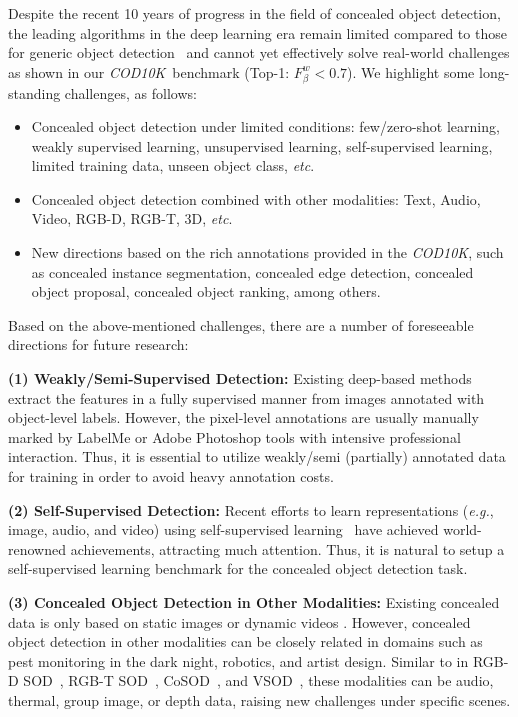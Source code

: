 \documentclass[10pt,journal,compsoc]{IEEEtran}
\def\eg{\emph{e.g.}}
\def\etc{\emph{etc}}
\def\ourdataset{\textit{COD10K}}
\begin{document}
Despite the recent 10 years of progress in the field of concealed object 
detection, 
the leading algorithms in the deep learning era remain limited compared to 
those for generic object detection~\cite{liu2020deep} and cannot yet 
effectively solve real-world challenges as shown in our \ourdataset~benchmark 
(Top-1: $F_\beta^w<0.7$). 
We highlight some long-standing challenges, as follows:
\begin{itemize}
\item Concealed object detection under limited conditions: 
few/zero-shot learning, weakly supervised learning, unsupervised learning, 
self-supervised learning, limited training data, unseen object class, \etc.

\item Concealed object detection combined with other modalities: 
Text, Audio, Video, RGB-D, RGB-T, 3D, \etc.

\item New directions based on the rich annotations provided in the \ourdataset,
such as concealed instance segmentation, concealed edge detection, 
concealed object proposal, concealed object ranking, among others.

\end{itemize}


Based on the above-mentioned challenges, there are a number of 
foreseeable directions for future research: 

\textbf{(1) Weakly/Semi-Supervised Detection:} 
Existing deep-based methods extract the features in a fully supervised manner 
from images annotated with object-level labels. 
However, the pixel-level annotations are usually manually marked by LabelMe 
or Adobe Photoshop tools with intensive professional interaction. 
Thus, it is essential to utilize weakly/semi (partially) annotated data 
for training in order to avoid heavy annotation costs. 

\textbf{(2) Self-Supervised Detection:} 
Recent efforts to learn representations (\eg, image, audio, and video)  
using self-supervised learning~\cite{afouras2020self,he2020momentum} 
have achieved  world-renowned achievements, attracting much attention. 
Thus, it is natural to setup a self-supervised learning benchmark for the 
concealed object detection task. 

\textbf{(3) Concealed Object Detection in Other Modalities:} 
Existing concealed data is only based on static images or dynamic videos
\cite{lamdouar2020betrayed}. 
However,  concealed object detection in other modalities can  be closely 
related in domains such as pest monitoring in the dark night, robotics, 
and artist design. 
Similar to in RGB-D SOD~\cite{Fan2019D3Net}, 
RGB-T SOD~\cite{zhang2019rgb}, CoSOD~\cite{deng2021re,Fan2021Group}, and VSOD~\cite{fan2019shifting}, 
these modalities can be audio, thermal, group image, or depth data, 
raising new challenges under specific scenes.  
\end{document}
